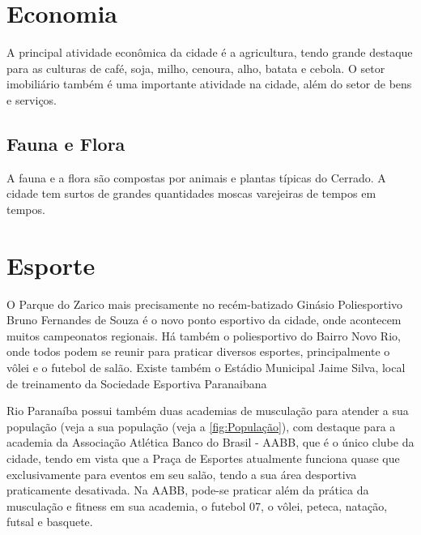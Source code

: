 \documentclass[
	12pt,				    %
	openright,			    %
	oneside,			    %
	a4paper,			    %
    sumario=tradicional,    %
	english,			    %
	brazil,				    %
	]{abntex2}              %
\begin{document}
\section{Economia}

A principal atividade econômica da cidade é a agricultura, tendo grande destaque para as culturas de café, soja, milho, cenoura, alho, batata e cebola. O setor imobiliário também é uma importante atividade na cidade, além do setor de bens e serviços.

\subsection{Fauna e Flora}

A fauna e a flora são compostas por animais e plantas típicas do Cerrado. A cidade tem surtos de grandes quantidades moscas varejeiras de tempos em tempos.

\section{Esporte}

O Parque do Zarico mais precisamente no recém-batizado Ginásio Poliesportivo Bruno Fernandes de Souza é o novo ponto esportivo da cidade, onde acontecem muitos campeonatos regionais. Há também o poliesportivo do Bairro Novo Rio, onde todos podem se reunir para praticar diversos esportes, principalmente o vôlei e o futebol de salão. Existe também o Estádio Municipal Jaime Silva, local de treinamento da Sociedade Esportiva Paranaibana

Rio Paranaíba possui também duas academias de musculação para atender a sua população (veja a sua população (veja a \autoref{fig:População}), com destaque para a academia da Associação Atlética Banco do Brasil - AABB, que é o único clube da cidade, tendo em vista que a Praça de Esportes atualmente funciona quase que exclusivamente para eventos em seu salão, tendo a sua área desportiva praticamente desativada. Na AABB, pode-se praticar além da prática da musculação e fitness em sua academia, o futebol 07, o vôlei, peteca, natação, futsal e basquete.
\end{document}
